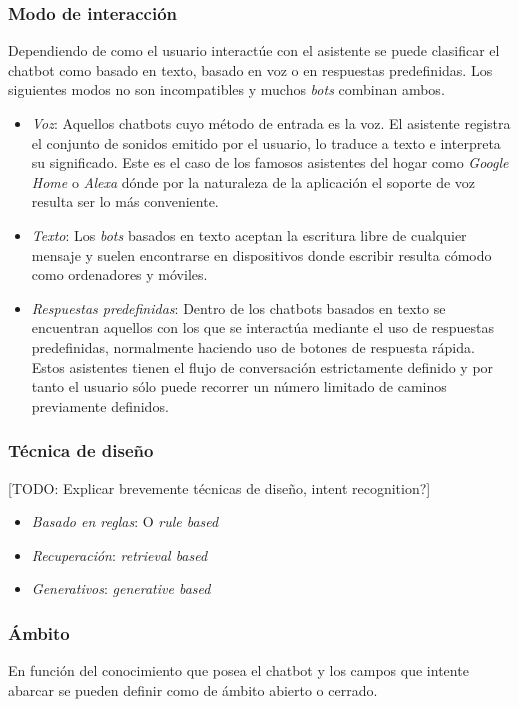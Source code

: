 \subsubsection{Modo de interacción}
Dependiendo de como el usuario interactúe con el asistente se puede clasificar el chatbot como basado en texto, basado en voz o en respuestas predefinidas. Los siguientes modos no son incompatibles y muchos \textit{bots} combinan ambos.


\begin{itemize}
	\item \textit{Voz}: Aquellos chatbots cuyo método de entrada es la voz. El asistente registra el conjunto de sonidos emitido por el usuario, lo traduce a texto e interpreta su significado. Este es el caso de los famosos asistentes del hogar como \textit{Google Home} o \textit{Alexa} dónde por la naturaleza de la aplicación el soporte de voz resulta ser lo más conveniente.
	\item \textit{Texto}: Los \textit{bots} basados en texto aceptan la escritura libre de cualquier mensaje y suelen encontrarse en dispositivos donde escribir resulta cómodo como ordenadores y móviles.
	\item \textit{Respuestas predefinidas}: Dentro de los chatbots basados en texto se encuentran aquellos con los que se interactúa mediante el uso de respuestas predefinidas, normalmente haciendo uso de botones de respuesta rápida. Estos asistentes tienen el flujo de conversación estrictamente definido y por tanto el usuario sólo puede recorrer un número limitado de caminos previamente definidos.
\end{itemize}



\subsubsection{Técnica de diseño}
[TODO: Explicar brevemente técnicas de diseño, intent recognition?]
\begin{itemize}
	\item \textit{Basado en reglas}: O \textit{rule based}
	\item \textit{Recuperación}: \textit{retrieval based}
	\item \textit{Generativos}: \textit{generative based} 
\end{itemize}

\subsubsection{Ámbito}
En función del conocimiento que posea el chatbot y los campos que intente abarcar se pueden definir como de ámbito abierto o cerrado.

